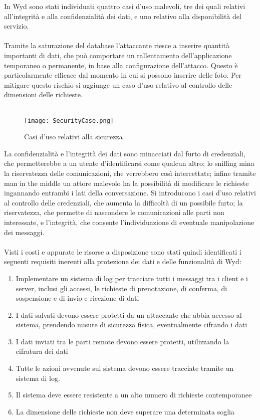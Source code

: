 In Wyd sono stati individuati quattro casi d'uso malevoli,
tre dei quali relativi all'integrità e alla confidenzialità dei dati,
e uno relativo alla disponibilità del servizio.\\
\\
Tramite la saturazione del database l'attaccante
riesce a inserire quantità importanti di dati,
che può comportare un rallentamento dell'applicazione temporaneo o permanente,
in base alla configurazione dell'attacco.
Questo è particolarmente efficace dal momento in cui si possono inserire delle foto.
Per mitigare questo rischio si aggiunge un caso d'uso relativo al controllo delle dimensioni delle richieste.\\
\\
\begin{figure}[hb]
    \begin{center}
        \texttt{[image: SecurityCase.png]}
        \caption{Casi d'uso relativi alla sicurezza}
    \end{center}
\end{figure}
\clearpage

La confidenzialità e l'integrità dei dati sono minacciati dal furto di credenziali,
che permetterebbe a un utente d'identificarsi come qualcun altro;
lo sniffing mina la riservatezza delle comunicazioni, che verrebbero così intercettate;
infine tramite man in the middle un attore malevolo ha la possibilità di modificare le richieste
ingannando entrambi i lati della conversazione.
Si introducono i casi d'uso relativi al controllo delle credenziali,
che aumenta la difficoltà di un possibile furto;
la riservatezza, che permette di nascondere le comunicazioni alle parti non interessate,
e l'integrità, che consente l'individuazione di eventuale manipolazione dei messaggi.\\
\\
Visti i costi e appurate le risorse a disposizione sono stati quindi identificati i seguenti requisiti
inerenti alla protezione dei dati e delle funzionalità di Wyd:

\begin{enumerate}
    \item Implementare un sistema di log per tracciare tutti i messaggi tra i client e i server, inclusi gli accessi, le richieste di prenotazione, di conferma, di sospensione e di invio e ricezione di dati
    \item I dati salvati devono essere protetti da un attaccante che abbia accesso al sistema, prendendo misure di sicurezza fisica, eventualmente cifrando i dati
    \item I dati inviati tra le parti remote devono essere protetti, utilizzando la cifratura dei dati
    \item Tutte le azioni avvenute sul sistema devono essere tracciate tramite un sistema di log.
    \item Il sistema deve essere resistente a un alto numero di richieste contemporanee
    \item La dimensione delle richieste non deve superare una determinata soglia
\end{enumerate}

